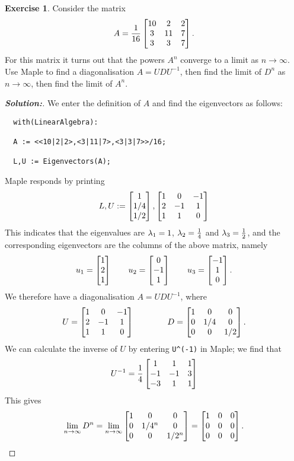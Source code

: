 \documentclass[a4paper]{amsart}
\theoremstyle{definition}
\newtheorem{exercise}{Exercise}
\newenvironment{solution}{\begin{proof}[\textbf{Solution:}] \vphantom{u}}{\end{proof}}
\begin{document}
\begin{exercise}\label{ex-powers-ii}
 Consider the matrix
 \[ A = \frac{1}{16} \left[\begin{matrix} 10 & 2 & 2 \\ 3 & 11 & 7 \\ 3 & 3 & 7 \end{matrix}\right].
 \]
 For this matrix it turns out that the powers $A^n$ converge to a
 limit as $n\to\infty$.  Use Maple to find a diagonalisation
 $A=UDU^{-1}$, then find the limit of $D^n$ as $n\to\infty$, then find
 the limit of $A^n$.
\end{exercise}
\begin{solution}
 We enter the definition of $A$ and find the eigenvectors as follows:
 \begin{verbatim}
  with(LinearAlgebra):

  A := <<10|2|2>,<3|11|7>,<3|3|7>>/16;

  L,U := Eigenvectors(A);
 \end{verbatim}
 Maple responds by printing
 \[ L,U := \left[\begin{matrix} 1\\ 1/4\\ 1/2\end{matrix}\right],
           \left[\begin{matrix} 1 & 0 & -1 \\ 2 & -1 & 1 \\ 1 & 1 & 0 \end{matrix}\right]
 \]
 This indicates that the eigenvalues are $\lambda_1=1$,
 $\lambda_2=\tfrac{1}{4}$ and $\lambda_3=\tfrac{1}{2}$, and the corresponding
 eigenvectors are the columns of the above matrix, namely
 \[ u_1 = \left[\begin{matrix} 1 \\ 2 \\ 1 \end{matrix}\right]\qquad
    u_2 = \left[\begin{matrix} 0 \\ -1 \\ 1 \end{matrix}\right]\qquad
    u_3 = \left[\begin{matrix} -1 \\ 1 \\ 0 \end{matrix}\right].
 \]
 We therefore have a diagonalisation $A=UDU^{-1}$, where 
 \[ U = \left[\begin{matrix} 1 & 0 & -1 \\ 2 & -1 & 1 \\ 1 & 1 & 0 \end{matrix}\right]
    \hspace{4em}
    D = \left[\begin{matrix} 1 & 0 & 0 \\ 0 & 1/4 & 0 \\ 0 & 0 & 1/2 \end{matrix}\right].
 \]
 We can calculate the inverse of $U$ by entering \verb+U^(-1)+ in
 Maple; we find that 
 \[ U^{-1} = \frac{1}{4} \left[\begin{matrix} 1&1&1 \\ -1&-1&3 \\ -3&1&1 \end{matrix}\right] \]
 This gives
 \[ \lim_{n\to\infty} D^n = 
    \lim_{n\to\infty} 
     \left[\begin{matrix} 1 & 0 & 0 \\ 0 & 1/4^n & 0 \\ 0 & 0 & 1/2^n \end{matrix}\right] = 
     \left[\begin{matrix} 1 & 0 & 0 \\ 0 & 0 & 0 \\ 0 & 0 & 0 \end{matrix}\right].
\]
\end{solution}
\end{document}
